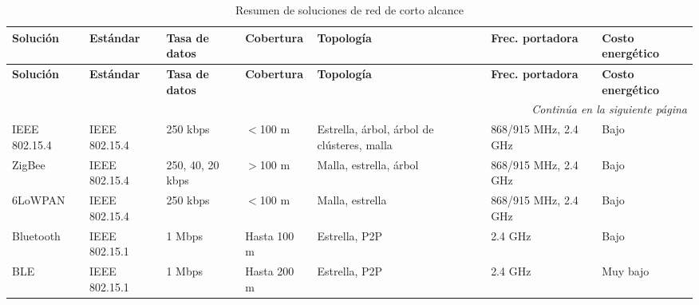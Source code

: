 \renewcommand{\arraystretch}{1.3}
\begin{longtable}{
    p{2cm}
    p{2.1cm}
    p{2cm}
    p{2.2cm}
    p{2cm}
    p{1.5cm}
    p{2.1cm}
}
\caption{Resumen de soluciones de red de corto alcance \cite{lopez2023}}
\label{tab:redes_corto_alcance} \\
\toprule
\textbf{Solución} & 
\textbf{Estándar} & 
\textbf{Tasa de datos} & 
\textbf{Cobertura} & 
\textbf{Topología} & 
\textbf{Frec. portadora} & 
\textbf{Costo energético} \\
\midrule
\endfirsthead

\toprule
\textbf{Solución} & 
\textbf{Estándar} & 
\textbf{Tasa de datos} & 
\textbf{Cobertura} & 
\textbf{Topología} & 
\textbf{Frec. portadora} & 
\textbf{Costo energético} \\
\midrule
\endhead

\midrule
\multicolumn{7}{r}{\textit{Continúa en la siguiente página}} \\

\endfoot

\bottomrule
\endlastfoot

IEEE 802.15.4 
& IEEE 802.15.4 
& 250 kbps 
& $<$100 m 
& Estrella, árbol, árbol de clústeres, malla 
& 868/915 MHz, 2.4 GHz 
& Bajo \\

ZigBee 
& IEEE 802.15.4 
& 250, 40, 20 kbps 
& $>$100 m 
& Malla, estrella, árbol 
& 868/915 MHz, 2.4 GHz 
& Bajo \\

6LoWPAN 
& IEEE 802.15.4 
& 250 kbps 
& $<$100 m 
& Malla, estrella 
& 868/915 MHz, 2.4 GHz 
& Bajo \\

Bluetooth 
& IEEE 802.15.1 
& 1 Mbps 
& Hasta 100 m 
& Estrella, P2P 
& 2.4 GHz 
& Bajo \\

BLE 
& IEEE 802.15.1 
& 1 Mbps 
& Hasta 200 m 
& Estrella, P2P 
& 2.4 GHz 
& Muy bajo \\

\end{longtable}